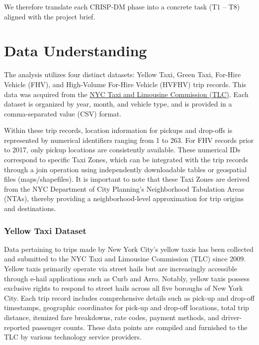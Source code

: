 \documentclass[conference]{IEEEtran}
\begin{document}
We therefore translate each CRISP-DM phase into a concrete task
(T1 – T8) aligned with the project brief.


\section{Data Understanding}
The analysis utilizes four distinct datasets: Yellow Taxi, Green Taxi, For-Hire Vehicle (FHV), and High-Volume
For-Hire Vehicle (HVFHV) trip records. This data was acquired from the
\href{https://www.nyc.gov/site/tlc/about/tlc-trip-record-data.page}{NYC Taxi and Limousine Commission (TLC)}.
Each dataset is organized by year, month, and vehicle type, and is provided in a comma-separated value (CSV) format.

Within these trip records, location information for pickups and drop-offs is represented by numerical identifiers
ranging from 1 to 263. For FHV records prior to 2017, only pickup locations are consistently available. These numerical
IDs correspond to specific Taxi Zones, which can be integrated with the trip records through a join operation using
independently downloadable tables or geospatial files (maps/shapefiles). It is important to note that these Taxi Zones
are derived from the NYC Department of City Planning's Neighborhood Tabulation Areas (NTAs), thereby providing a
neighborhood-level approximation for trip origins and destinations.

\subsubsection*{Yellow Taxi Dataset}
Data pertaining to trips made by New York City's yellow taxis has been collected and submitted to the NYC Taxi and
Limousine Commission (TLC) since 2009. Yellow taxis primarily operate via street hails but are increasingly accessible
through e-hail applications such as Curb and Arro. Notably, yellow taxis possess exclusive rights to respond to street
hails across all five boroughs of New York City.
Each trip record includes comprehensive details such as pick-up and drop-off timestamps, geographic coordinates for
pick-up and drop-off locations, total trip distance, itemized fare breakdowns, rate codes, payment methods, and
driver-reported passenger counts. These data points are compiled and furnished to the TLC by various technology
service providers.
\end{document}
